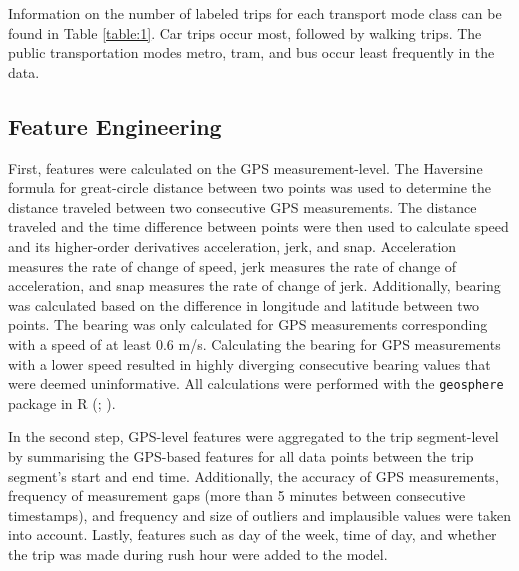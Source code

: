 \documentclass[10pt, a4paper, titlepage, hidelinks]{article}
\begin{document}
Information on the number of labeled trips for each transport mode class can be found in Table \ref{table:1}. Car trips occur most, followed by walking trips. The public transportation modes metro, tram, and bus occur least frequently in the data.

\subsection{Feature Engineering}

\begin{table}[]
        \caption{Labeled trips per transport mode class}
        \centering
    \end{table}

First, features were calculated on the GPS measurement-level. The Haversine formula for great-circle distance between two points was used to determine the distance traveled between two consecutive GPS measurements. The distance traveled and the time difference between points were then used to calculate speed and its higher-order derivatives acceleration, jerk, and snap. Acceleration measures the rate of change of speed, jerk measures the rate of change of acceleration, and snap measures the rate of change of jerk. Additionally, bearing was calculated based on the difference in longitude and latitude between two points. The bearing was only calculated for GPS measurements corresponding with a speed of at least 0.6 m/s. Calculating the bearing for GPS measurements with a lower speed resulted in highly diverging consecutive bearing values that were deemed uninformative. All calculations were performed with the \texttt{geosphere} package in R (\cite{geosphere}; \cite{R}).

In the second step, GPS-level features were aggregated to the trip segment-level by summarising the GPS-based features for all data points between the trip segment's start and end time. Additionally, the accuracy of GPS measurements, frequency of measurement gaps (more than 5 minutes between consecutive timestamps), and frequency and size of outliers and implausible values were taken into account. Lastly, features such as day of the week, time of day, and whether the trip was made during rush hour were added to the model.
\end{document}
